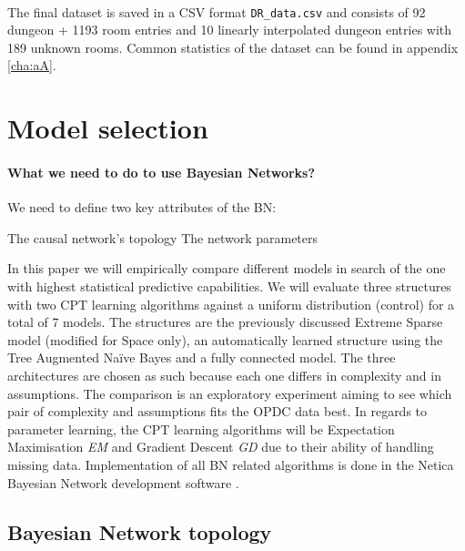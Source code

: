 \documentclass{UoYCSproject}
\begin{document}
\paragraph{}
The final dataset is saved in a CSV format \texttt{DR\_data.csv} and consists of 92 dungeon + 1193 room entries and 10 linearly interpolated dungeon entries with 189 unknown rooms. Common statistics of the dataset can be found in appendix \ref{cha:aA}.

\section{Model selection} %
\label{sec:model_selection}

\paragraph{What we need to do to use Bayesian Networks?}
We need to define two key attributes of the BN:
\begin{outline}[enumerate]
  \1 The causal network's topology
  \1 The network parameters
\end{outline}
In this paper we will empirically compare different models in search of the one with highest statistical predictive capabilities. We will evaluate three structures with two CPT learning algorithms against a uniform distribution (control) for a total of 7 models. The structures are the previously discussed Extreme Sparse model (modified for Space only), an automatically learned structure using the Tree Augmented Na\"{i}ve Bayes and a fully connected model. The three architectures are chosen as such because each one differs in complexity and in assumptions. The comparison is an exploratory experiment aiming to see which pair of complexity and assumptions fits the OPDC data best. In regards to parameter learning, the CPT learning algorithms will be Expectation Maximisation \textit{EM} and Gradient Descent \textit{GD} due to their ability of handling missing data. Implementation of all BN related algorithms is done in the Netica Bayesian Network development software \parencite{netica}.

\subsection{Bayesian Network topology}
\end{document}
